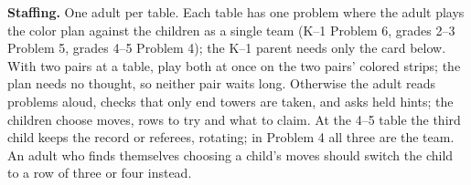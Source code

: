 \documentclass[11pt]{article}
\begin{document}
\textbf{Staffing.} One adult per table. Each table has one problem where the adult plays the color plan against the children as a single team (K--1 Problem 6, grades 2--3 Problem 5, grades 4--5 Problem 4); the K--1 parent needs only the card below. With two pairs at a table, play both at once on the two pairs' colored strips; the plan needs no thought, so neither pair waits long. Otherwise the adult reads problems aloud, checks that only end towers are taken, and asks held hints; the children choose moves, rows to try and what to claim. At the 4--5 table the third child keeps the record or referees, rotating; in Problem 4 all three are the team. An adult who finds themselves choosing a child's moves should switch the child to a row of three or four instead.

\noindent{}
\end{document}
